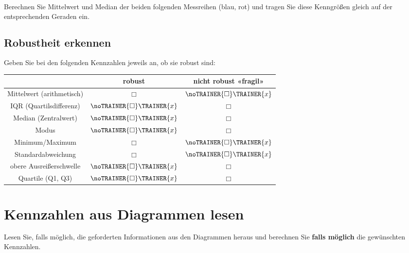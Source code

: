 Berechnen Sie Mittelwert und Median der beiden folgenden Messreihen (blau, rot)
und tragen Sie diese Kenngrößen gleich auf der entsprechenden Geraden
ein.



\subsection{Robustheit erkennen}

Geben Sie bei den folgenden Kennzahlen jeweils an, ob sie robust sind:


\begin{tabular}{c|c|c}
 & robust & nicht robust «fragil»\\\hline

Mittelwert (arithmetisch) & $\Box{}$ & $\noTRAINER{\Box{}}\TRAINER{x}$ \\
IQR (Quartilsdifferenz)   & $\noTRAINER{\Box{}}\TRAINER{x}$ & $\Box{}$ \\
Median (Zentralwert)      & $\noTRAINER{\Box{}}\TRAINER{x}$ & $\Box{}$ \\
Modus                     & $\noTRAINER{\Box{}}\TRAINER{x}$ & $\Box{}$ \\
Minimum/Maximum           & $\Box{}$ & $\noTRAINER{\Box{}}\TRAINER{x}$ \\
Standardabweichung        & $\Box{}$ & $\noTRAINER{\Box{}}\TRAINER{x}$ \\
obere Ausreißerschwelle   & $\noTRAINER{\Box{}}\TRAINER{x}$ & $\Box{}$ \\
Quartile (Q1, Q3)         & $\noTRAINER{\Box{}}\TRAINER{x}$ & $\Box{}$ \\

\end{tabular}


\newpage

\section{Kennzahlen aus Diagrammen lesen}
Lesen Sie, falls möglich, die geforderten Informationen aus den
Diagrammen heraus und berechnen Sie \textbf{falls möglich} die gewünschten Kennzahlen.


